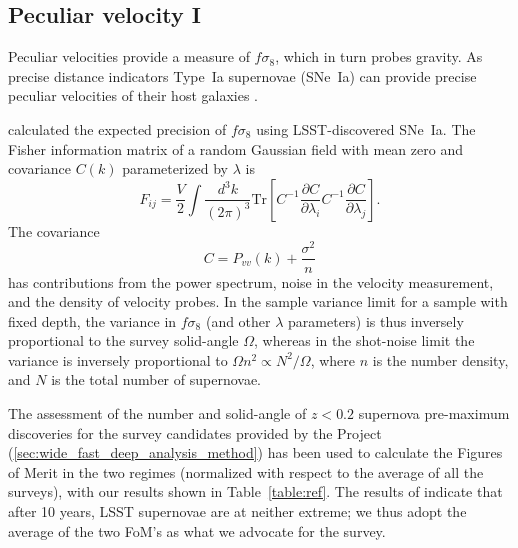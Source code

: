 \subsection{Peculiar velocity I}


Peculiar velocities provide a measure of $f\sigma_8$, which in turn probes gravity.  As precise distance indicators Type~Ia supernovae (SNe~Ia)
can provide precise peculiar velocities of their host galaxies \cite{hui,davis}.

\cite{howlett} calculated the  expected precision of $f\sigma_8$ using LSST-discovered SNe~Ia.
The Fisher information matrix of a random Gaussian field with mean zero and covariance $C(k)$ parameterized by $\lambda$ is
\begin{equation}
F_{ij} = \frac{V}{2}\int \frac{d^3k}{(2\pi)^3} \text{Tr}\left[ C^{-1} \frac{\partial C}{\partial \lambda_i} C^{-1}
\frac{\partial C}{\partial \lambda_j} \right].
\end{equation}
The covariance
\begin{equation}
C = P_{vv}(k) + \frac{\sigma^2}{n}
\end{equation}
has contributions from the power spectrum, noise in the velocity measurement, and the density of velocity probes.
In the sample variance limit for a sample with fixed depth, the variance in $f\sigma_8$ (and other $\lambda$ parameters)
is thus inversely proportional to the survey solid-angle $\Omega$, whereas
in the shot-noise limit the variance is inversely proportional to $\Omega n^2 \propto N^2/\Omega$, where $n$ is the number density,
and $N$ is the total number of supernovae.  



The assessment of the number and solid-angle of $z<0.2$ supernova pre-maximum discoveries 
for the survey candidates provided by the Project (\ref{sec:wide_fast_deep_analysis_method})  has been used to calculate the Figures of Merit in the two regimes 
(normalized with respect to the average of all the surveys),
with our results shown in 
Table~\ref{table:ref}.  The results of \cite{howlett}  indicate that after 10 years,
LSST supernovae are at neither extreme; we thus adopt the average of the two FoM's as what we advocate for the survey.


